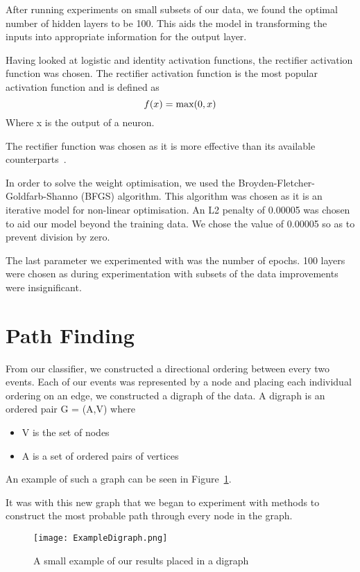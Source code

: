 \documentclass[bsc,frontabs,twoside,singlespacing,parskip,deptreport]{infthesis}     %
\begin{document}
 After running experiments on  small subsets of our data, we found the optimal number of hidden layers to be 100. 
 This aids the model in transforming the inputs into appropriate information for the output layer.
 
 Having looked at logistic and identity activation functions, the rectifier activation function was chosen.
 The rectifier activation function is the most popular activation function \cite{lecun2015deep} and is defined as
 \begin{equation}
   f(x) = \text{max}(0,x)\nonumber\\
 \end{equation}
 Where x is the output of a neuron.
 
 The rectifier function was chosen as it is more effective than its available counterparts~\cite{glorot2011deep}.

 In order to solve the weight optimisation, we used the Broyden-Fletcher-Goldfarb-Shanno (BFGS) algorithm.
 This algorithm was chosen as it is an iterative model for non-linear optimisation.
 An L2 penalty of 0.00005 was chosen to aid our model beyond the training data.
 We chose the value of 0.00005 so as to prevent division by zero. 

 The last parameter we experimented with was the number of epochs.
 100 layers were chosen as during experimentation with subsets of the data improvements were
 insignificant.

 \section{Path Finding} \label{chapter:graphing}
From our classifier, we constructed a directional ordering between every two events.
Each of our events was represented by a node and placing each individual ordering on an edge, we constructed
a digraph of the data.
A digraph is an ordered pair G = (A,V) where~\cite{bang2008digraphs}
\begin{itemize}
  \item V is the set of nodes
  \item A is a set of ordered pairs of vertices
\end{itemize}
An example of such a graph can be seen in Figure~\ref{fig:digraph}.

It was with this new graph that we began to experiment with methods to construct the most probable path through every
node in the graph.


\begin{figure}
  \centering
  \texttt{[image: ExampleDigraph.png]}
  \caption{A small example of our results placed in a digraph}
  \label{fig:digraph}
 \end{figure}
\end{document}
